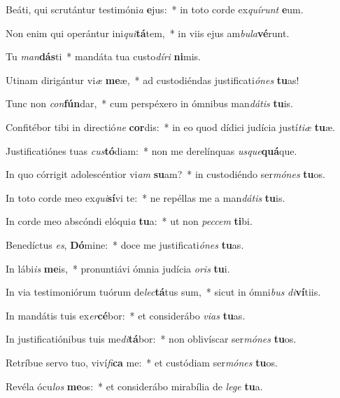 \item Beáti, qui scrutántur testimóni\textit{a} \textbf{e}jus:~* in toto corde ex\textit{quí}\textit{runt} \textbf{e}um.
\item Non enim qui operántur ini\textit{qui}\textbf{tá}tem,~* in viis ejus am\textit{bu}\textit{la}\textbf{vé}runt.
\item Tu \textit{man}\textbf{dás}ti~* mandáta tua custo\textit{dí}\textit{ri} \textbf{ni}mis.
\item Utinam dirigántur vi\textit{æ} \textbf{me}æ,~* ad custodiéndas justificati\textit{ó}\textit{nes} \textbf{tu}as!
\item Tunc non \textit{con}\textbf{fún}dar,~* cum perspéxero in ómnibus man\textit{dá}\textit{tis} \textbf{tu}is.
\item Confitébor tibi in directió\textit{ne} \textbf{cor}dis:~* in eo quod dídici judícia justí\textit{ti}\textit{æ} \textbf{tu}æ.
\item Justificatiónes tuas \textit{cus}\textbf{tó}diam:~* non me derelínquas \textit{us}\textit{que}\textbf{quá}que.
\item In quo córrigit adolescéntior vi\textit{am} \textbf{su}am?~* in custodiéndo ser\textit{mó}\textit{nes} \textbf{tu}os.
\item In toto corde meo ex\textit{qui}\textbf{sí}vi te:~* ne repéllas me a man\textit{dá}\textit{tis} \textbf{tu}is.
\item In corde meo abscóndi elóqui\textit{a} \textbf{tu}a:~* ut non \textit{pec}\textit{cem} \textbf{ti}bi.
\item Benedíctus \textit{es}, \textbf{Dó}mine:~* doce me justificati\textit{ó}\textit{nes} \textbf{tu}as.
\item In lábi\textit{is} \textbf{me}is,~* pronuntiávi ómnia judícia \textit{o}\textit{ris} \textbf{tu}i.
\item In via testimoniórum tuórum de\textit{lec}\textbf{tá}tus sum,~* sicut in ómni\textit{bus} \textit{di}\textbf{ví}tiis.
\item In mandátis tuis ex\textit{er}\textbf{cé}bor:~* et considerábo \textit{vi}\textit{as} \textbf{tu}as.
\item In justificatiónibus tuis me\textit{di}\textbf{tá}bor:~* non oblivíscar ser\textit{mó}\textit{nes} \textbf{tu}os.
\item Retríbue servo tuo, viví\textit{fi}\textbf{ca} me:~* et custódiam ser\textit{mó}\textit{nes} \textbf{tu}os.
\item Revéla ócu\textit{los} \textbf{me}os:~* et considerábo mirabília de \textit{le}\textit{ge} \textbf{tu}a.
